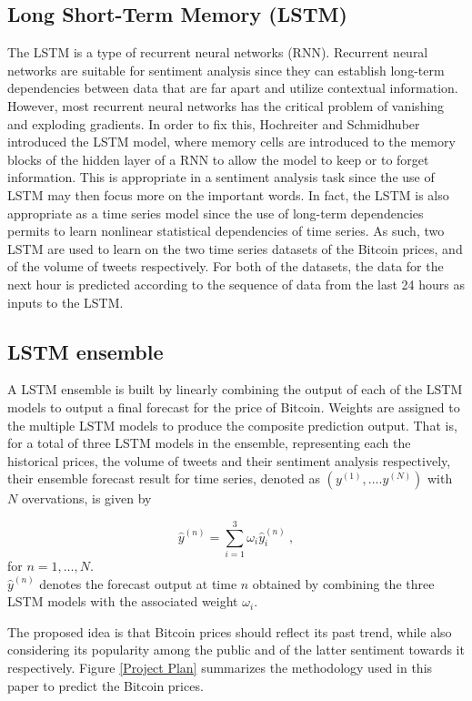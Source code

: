 \documentclass[conference]{IEEEtran}
\begin{document}
\subsection{Long Short-Term Memory (LSTM)}
\par The LSTM is a type of recurrent neural networks (RNN). Recurrent neural networks are suitable for sentiment analysis since they can establish long-term dependencies between data that are far apart and utilize contextual information. However, most recurrent neural networks has the critical problem of vanishing and exploding gradients. In order to fix this, Hochreiter and Schmidhuber \cite{LSTM} introduced the LSTM model, where memory cells are introduced to the memory blocks of the hidden layer of a RNN to allow the model to keep or to forget information. This is appropriate in a sentiment analysis task since the use of LSTM may then focus more on the important words. In fact, the LSTM is also appropriate as a time series model since the use of long-term dependencies permits to learn nonlinear statistical dependencies of time series. As such, two LSTM are used to learn on the two time series datasets of the Bitcoin prices, and of the volume of tweets respectively. For both of the datasets, the data for the next hour is predicted according to the sequence of data from the last 24 hours as inputs to the LSTM.

\subsection{LSTM ensemble}
\par A LSTM ensemble is built by linearly combining the output of each of the LSTM models to output a final forecast for the price of Bitcoin. Weights are assigned to the multiple LSTM models to produce the composite prediction output. That is, for a total of three LSTM models in the ensemble, representing each the historical prices, the volume of tweets and their sentiment analysis respectively, their ensemble forecast result for time series, denoted as $(y^{(1)}, \dots. y^{(N)})$ with $N$ overvations, is given by 

\begin{equation}
\label{LSTM ensemble weights}
\hat{y}^{(n)} = \sum_{i = 1}^{3} \omega_{i} \hat{y}_{i}^{(n)} ~, 
\end{equation} 
for $n = 1, \dots, N$.\\
$\hat{y}^{(n)}$ denotes the forecast output at time $n$ obtained by combining the three LSTM models with the associated weight $\omega_{i}$.
\par The proposed idea is that Bitcoin prices should reflect its past trend, while also considering its popularity among the public and of the latter sentiment towards it respectively. Figure \ref{Project Plan} summarizes the methodology used in this paper to predict the Bitcoin prices.
\end{document}
